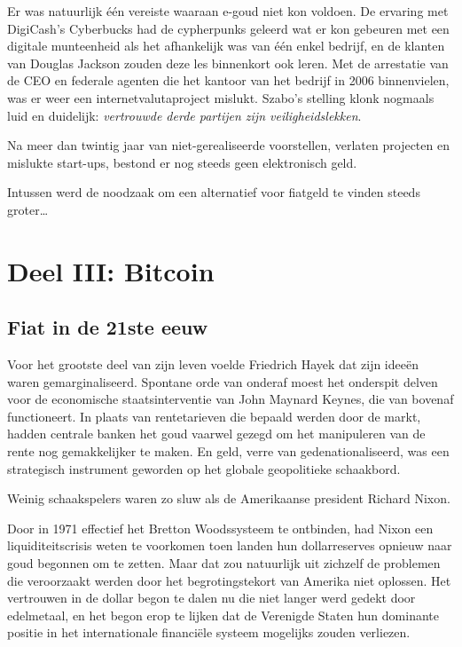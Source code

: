 \documentclass[
  a5paper,
  smalldemyvopaper,11pt,twoside,onecolumn,openright,extrafontsizes]{memoir}
\begin{document}
Er was natuurlijk één vereiste waaraan e-goud niet kon voldoen. De
ervaring met DigiCash's Cyberbucks had de cypherpunks geleerd wat er kon
gebeuren met een digitale munteenheid als het afhankelijk was van één
enkel bedrijf, en de klanten van Douglas Jackson zouden deze les
binnenkort ook leren. Met de arrestatie van de CEO en federale agenten
die het kantoor van het bedrijf in 2006 binnenvielen, was er weer een
internetvalutaproject mislukt. Szabo's stelling klonk nogmaals luid en
duidelijk: \emph{vertrouwde derde partijen zijn veiligheidslekken}.

Na meer dan twintig jaar van niet-gerealiseerde voorstellen, verlaten
projecten en mislukte start-ups, bestond er nog steeds geen elektronisch
geld.

Intussen werd de noodzaak om een alternatief voor fiatgeld te vinden
steeds groter\ldots{}

\part{Deel III: Bitcoin}

\chapter{Fiat in de 21ste eeuw}\label{fiat-in-de-21ste-eeuw}

Voor het grootste deel van zijn leven voelde Friedrich Hayek dat zijn
ideeën waren gemarginaliseerd. Spontane orde van onderaf moest het
onderspit delven voor de economische staatsinterventie van John Maynard
Keynes, die van bovenaf functioneert. In plaats van rentetarieven die
bepaald werden door de markt, hadden centrale banken het goud vaarwel
gezegd om het manipuleren van de rente nog gemakkelijker te maken. En
geld, verre van gedenationaliseerd, was een strategisch instrument
geworden op het globale geopolitieke schaakbord.

Weinig schaakspelers waren zo sluw als de Amerikaanse president Richard
Nixon.

Door in 1971 effectief het Bretton Woodssysteem te ontbinden, had Nixon
een liquiditeitscrisis weten te voorkomen toen landen hun dollarreserves
opnieuw naar goud begonnen om te zetten. Maar dat zou natuurlijk uit
zichzelf de problemen die veroorzaakt werden door het begrotingstekort
van Amerika niet oplossen. Het vertrouwen in de dollar begon te dalen nu
die niet langer werd gedekt door edelmetaal, en het begon erop te lijken
dat de Verenigde Staten hun dominante positie in het internationale
financiële systeem mogelijks zouden verliezen.
\end{document}
